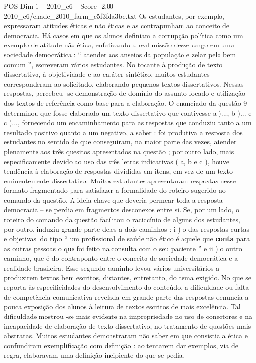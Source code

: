 \begin{textsample}{POS Dim 1 – 2010\_c6 – Score -2.00 – 2010\_c6/enade\_2010\_farm\_c5f3fda3be.txt}
Os estudantes, por exemplo, expressaram atitudes éticas e não éticas e as contrapunham ao conceito de democracia.
Há casos em que os alunos definiam a corrupção política como um exemplo de atitude não ética, enfatizando a real missão desse cargo em uma sociedade democrática : “ atender aos anseios da população e zelar pelo bem comum ”, escreveram vários estudantes.
No tocante à produção de texto dissertativo, à objetividade e ao caráter sintético, muitos estudantes corresponderam ao solicitado, elaborando pequenos textos dissertativos.
Nessas respostas, percebeu -se demonstração de domínio do assunto focado e utilização dos textos de referência como base para a elaboração.
O enunciado da questão 9 determinou que fosse elaborado um texto dissertativo que contivesse a )..., b )... e c )..., fornecendo um encaminhamento para as respostas que conduziu tanto a um resultado positivo quanto a um negativo, a saber : foi produtiva a resposta dos estudantes no sentido de que conseguiram, na maior parte das vezes, atender plenamente aos três quesitos apresentados na questão ; por outro lado, mais especificamente devido ao uso das três letras indicativas ( a, b e c ), houve tendência à elaboração de respostas divididas em itens, em vez de um texto eminentemente dissertativo.
Muitos estudantes apresentaram respostas nesse formato fragmentado para satisfazer a formalidade do roteiro sugerido no comando da questão.
A ideia-chave que deveria permear toda a resposta – democracia – se perdia em fragmentos desconexos entre si.
Se, por um lado, o roteiro do comando da questão facilitou o raciocínio de alguns dos estudantes, por outro, induziu grande parte deles a dois caminhos : i ) o das respostas curtas e objetivas, do tipo “ um profissional de saúde não ético é aquele que \textbf{conta} para as outras pessoas o que foi feito na consulta com o seu paciente ” e ii ) o outro caminho, que é do contraponto entre o conceito de sociedade democrática e a realidade brasileira.
Esse segundo caminho levou vários universitários a produzirem textos bem escritos, distantes, entretanto, do tema exigido.
No que se reporta às especificidades do desenvolvimento do conteúdo, a dificuldade ou falta de competência comunicativa revelada em grande parte das respostas denuncia a pouca exposição dos alunos à leitura de textos escritos de mais excelência.
Tal dificuldade mostrou -se mais evidente na impropriedade no uso de conectores e na incapacidade de elaboração de texto dissertativo, no tratamento de questões mais abstratas.
Muitos estudantes demonstraram não saber em que consistia a ética e confundiram exemplificação com definição : ao tentarem dar exemplos, via de regra, elaboravam uma definição incipiente do que se pedia.

\end{textsample}
